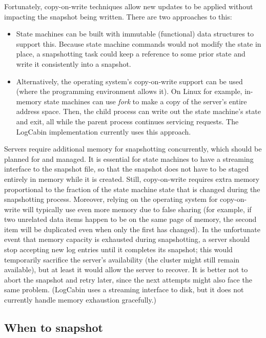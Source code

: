Fortunately, copy-on-write techniques allow new updates to be applied
without impacting the snapshot being written.
There are two approaches to this:
%
\begin{itemize}
%
\item State machines can be built with immutable (functional) data
structures to support this. Because state machine commands would not modify
the state in place, a snapshotting task could keep a reference to
some prior state and write it consistently into a snapshot.
\item
Alternatively, the operating system's copy-on-write support can be used
(where the programming environment allows it).
On Linux for example, in-memory state machines can use \emph{fork} to make a
copy of the server's entire address space. Then, the child process can
write out the state machine's state and exit, all while the parent
process continues servicing requests. The LogCabin implementation
currently uses this approach.
\end{itemize}

Servers require additional memory for snapshotting concurrently, which should be
planned for and managed. It is essential for state machines to have a
streaming interface to the snapshot file, so that the snapshot does not
have to be staged entirely in memory while it is created. Still,
copy-on-write requires extra memory proportional to the fraction of the
state machine state that is changed during the snapshotting process. Moreover, relying on
the operating system for copy-on-write will typically use even more
memory due to false sharing (for example, if two unrelated data items
happen to be on the same page of memory, the second item will be
duplicated even when only the first has changed). In the unfortunate
event that memory capacity is exhausted during snapshotting, a server should
stop accepting new log entries until it completes its snapshot; this
would temporarily sacrifice the server's availability (the cluster might
still remain available), but at least it would allow the server to
recover. It is better not to abort the snapshot and retry later,
since the next attempts might also face the same problem.
(LogCabin uses a streaming interface to disk, but it does not currently
handle memory exhaustion gracefully.)


\subsection{When to snapshot}
\label{compaction:memsnapshot:when}

